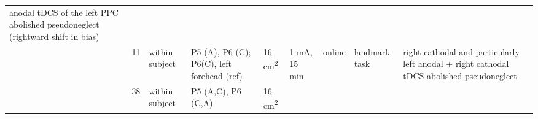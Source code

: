 \documentclass[11pt,english,]{memoir}
\begin{document}
\begin{longtable}[]{@{}lllllllll@{}}
\begin{minipage}[t]{0.28\columnwidth}
anodal tDCS of the left PPC abolished pseudoneglect
(rightward shift in bias)\strut
\end{minipage}\tabularnewline
\begin{minipage}[t]{0.09\columnwidth}\raggedright
\textcite{Giglia2011}\strut
\end{minipage} & \begin{minipage}[t]{0.02\columnwidth}\raggedright
11\strut
\end{minipage} & \begin{minipage}[t]{0.04\columnwidth}\raggedright
within
subject\strut
\end{minipage} & \begin{minipage}[t]{0.10\columnwidth}\raggedright
P5 (A), P6 (C);
P6(C), left forehead
(ref)\strut
\end{minipage} & \begin{minipage}[t]{0.04\columnwidth}\raggedright
16
cm\textsuperscript{2}\strut
\end{minipage} & \begin{minipage}[t]{0.04\columnwidth}\raggedright
1 mA,
15 min\strut
\end{minipage} & \begin{minipage}[t]{0.04\columnwidth}\raggedright
online\strut
\end{minipage} & \begin{minipage}[t]{0.10\columnwidth}\raggedright
landmark task\strut
\end{minipage} & \begin{minipage}[t]{0.28\columnwidth}\raggedright
right cathodal and particularly left anodal + right cathodal
tDCS abolished pseudoneglect\strut
\end{minipage}\tabularnewline
\begin{minipage}[t]{0.09\columnwidth}\raggedright
\textcite{Benwell2015}\strut
\end{minipage} & \begin{minipage}[t]{0.02\columnwidth}\raggedright
38\strut
\end{minipage} & \begin{minipage}[t]{0.04\columnwidth}\raggedright
within
subject\strut
\end{minipage} & \begin{minipage}[t]{0.10\columnwidth}\raggedright
P5 (A,C), P6 (C,A)\strut
\end{minipage} & \begin{minipage}[t]{0.04\columnwidth}\raggedright
16
cm\textsuperscript{2}\strut
\end{minipage} & \begin{minipage}[t]{0.04\columnwidth}\raggedright

\end{minipage}
\end{longtable}
\end{document}
